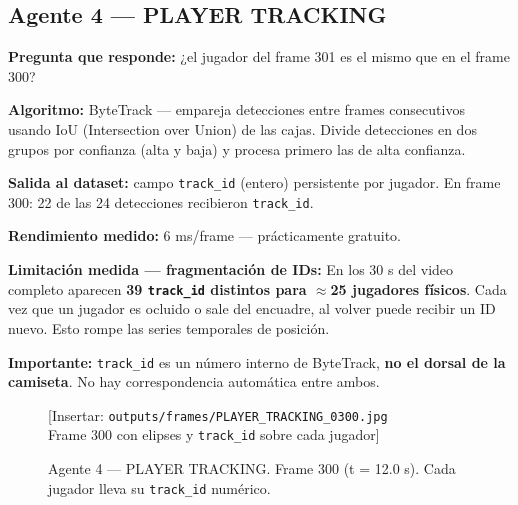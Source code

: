 \documentclass[11pt,a4paper]{article}
\begin{document}
\subsection{Agente 4 — PLAYER TRACKING}

\textbf{Pregunta que responde:} ¿el jugador del frame 301 es el mismo
que en el frame 300?

\textbf{Algoritmo:} ByteTrack — empareja detecciones entre frames consecutivos
usando IoU (Intersection over Union) de las cajas. Divide detecciones en dos
grupos por confianza (alta y baja) y procesa primero las de alta confianza.

\textbf{Salida al dataset:} campo \texttt{track\_id} (entero) persistente
por jugador. En frame 300: 22 de las 24 detecciones recibieron \texttt{track\_id}.

\textbf{Rendimiento medido:} 6 ms/frame — prácticamente gratuito.

\begin{alertbox}
\textbf{Limitación medida — fragmentación de IDs:}
En los 30 s del video completo aparecen \textbf{39 \texttt{track\_id} distintos
para $\approx$25 jugadores físicos}. Cada vez que un jugador es ocluido o sale
del encuadre, al volver puede recibir un ID nuevo. Esto rompe las series
temporales de posición.

\medskip
\textbf{Importante:} \texttt{track\_id} es un número interno de ByteTrack,
\textbf{no el dorsal de la camiseta}. No hay correspondencia automática
entre ambos.
\end{alertbox}

\begin{figure}[H]
  \centering
  \begin{mdframed}[
    linecolor=gray!40, linewidth=1pt,
    innertopmargin=50pt, innerbottommargin=50pt,
    backgroundcolor=gray!8
  ]
    \centering\color{gray!60}
    [Insertar: \texttt{outputs/frames/PLAYER\_TRACKING\_0300.jpg} \\
    Frame 300 con elipses y \texttt{track\_id} sobre cada jugador]
  \end{mdframed}
  \caption{Agente 4 — PLAYER TRACKING. Frame 300 (t = 12.0 s).
           Cada jugador lleva su \texttt{track\_id} numérico.}
  \label{fig:tracking}
\end{figure}
\end{document}
